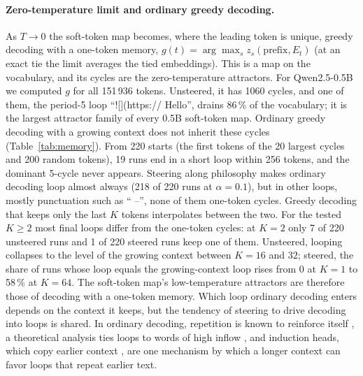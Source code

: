 \documentclass[11pt,letterpaper]{article}
\begin{document}
\paragraph{Zero-temperature limit and ordinary greedy decoding.} As $T\to0$ the soft-token map becomes, where the
leading token is unique, greedy decoding with a one-token memory, $g(t)=\arg\max_s z_s(\text{prefix},E_t)$ (at an exact
tie the limit averages the tied embeddings). This is a map on the vocabulary, and its
cycles are the zero-temperature attractors. For Qwen2.5-0.5B we computed $g$ for all 151\,936 tokens. Unsteered, it
has 1060 cycles, and one of them, the period-5 loop ``![](https:// Hello'', drains 86\,\% of the vocabulary; it is
the largest attractor family of every 0.5B soft-token map. Ordinary greedy decoding with a growing context does not
inherit these cycles (Table~\ref{tab:memory}). From 220 starts (the first tokens of the 20 largest cycles and 200
random tokens), 19 runs end in a short loop within 256 tokens, and the dominant 5-cycle never appears. Steering
along philosophy makes ordinary decoding loop almost always (218 of 220 runs at $\alpha=0.1$), but in other loops,
mostly punctuation such as `` --'', none of them one-token cycles. Greedy decoding that keeps only the last $K$
tokens interpolates between the two. For the tested $K\ge2$ most final loops differ from the one-token cycles: at
$K=2$ only 7 of 220 unsteered runs and 1 of 220 steered runs keep one of them. Unsteered, looping
collapses to the level of the growing context between $K=16$ and $32$; steered, the share of runs whose loop equals
the growing-context loop rises from 0 at $K=1$ to 58\,\% at $K=64$. The soft-token map's low-temperature attractors
are therefore those of decoding with a one-token memory. Which loop ordinary decoding enters depends on the context
it keeps, but the tendency of steering to drive decoding into loops is shared. In ordinary decoding, repetition is
known to reinforce itself \cite{holtzman2019degeneration,xu2022loop}, a theoretical analysis ties loops to words of
high inflow \cite{fu2021repetition}, and induction heads, which copy
earlier context \cite{olsson2022induction}, are one mechanism by which a longer context can favor loops that repeat
earlier text.
\end{document}
